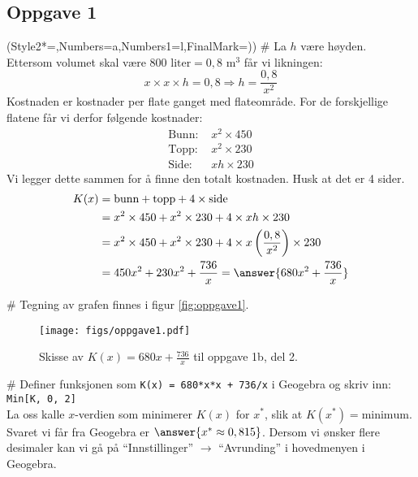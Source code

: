 \subsection*{Oppgave 1}
\begin{easylist}[enumerate]
	\ListProperties(Style2*=,Numbers=a,Numbers1=l,FinalMark={)})
	# La $h$ være høyden. Ettersom volumet skal være $800 \text{ liter} = 0,8 \text{ m}^3$ får vi likningen:
	\begin{equation*}
	x \times x \times h = 0,8 \Rightarrow h = \frac{0,8}{x^2}
	\end{equation*}
	Kostnaden er kostnader per flate ganget med flateområde. For de forskjellige flatene får vi derfor følgende kostnader:
	\begin{align*}
	\text{Bunn: }& x^2 \times 450 \\
	\text{Topp: }& x^2 \times 230 \\
	\text{Side: }& xh \times 230 
	\end{align*}
	Vi legger dette sammen for å finne den totalt kostnaden. Husk at det er 4 sider. 
	\begin{align*}
	K(x) &= \text{bunn} + \text{topp} + 4 \times \text{side} \\ 
	&= x^2 \times 450 + x^2 \times 230 + 4 \times xh \times 230 \\ 
	&= x^2 \times 450 + x^2 \times 230 + 4 \times x\left(\frac{0,8}{x^2}\right) \times 230 \\ 
	&= 450x^2 + 230 x^2 + \frac{736}{x} = \answer{680 x^2 + \frac{736}{x}}
	\end{align*}
	
	# Tegning av grafen finnes i figur \eqref{fig:oppgave1}.
	\begin{figure}[th!]
		\centering
		\texttt{[image: figs/oppgave1.pdf]}
		\caption{Skisse av $K(x) = 680x + \frac{736}{x}$ til oppgave 1b, del 2.}
		\label{fig:oppgave1}
	\end{figure}
	
	# Definer funksjonen som \texttt{K(x) = 680*x*x + 736/x} i Geogebra og skriv inn:\\
	\texttt{Min[K, 0, 2]} \\
	La oss kalle $x$-verdien som minimerer $K(x)$ for $x^*$, slik at $K(x^*) = \text{minimum}$.
	Svaret vi får fra Geogebra er $\answer{x^* \approx 0,815}$. Dersom vi ønsker flere desimaler kan vi gå på ``Innstillinger'' $\rightarrow$ ``Avrunding'' i hovedmenyen i Geogebra.
\end{easylist}

